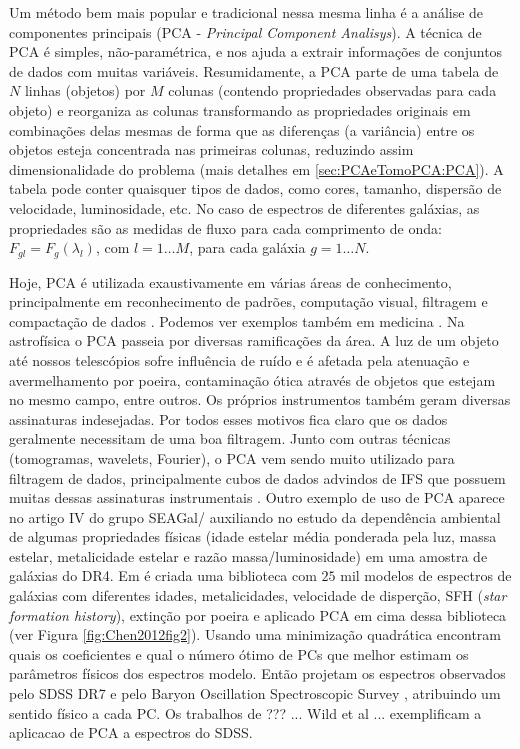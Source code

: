 Um método bem mais popular e tradicional nessa mesma linha é a análise de componentes principais (PCA - {\em Principal
Component Analisys}). A técnica de PCA é simples, não-paramétrica, e nos ajuda a extrair informações de conjuntos de
dados com muitas variáveis. Resumidamente, a PCA parte de uma tabela de $N$ linhas (objetos) por $M$ colunas (contendo
propriedades observadas para cada objeto) e reorganiza as colunas transformando as propriedades originais em combinações
delas mesmas de forma que as diferenças (a variância) entre os objetos  esteja concentrada nas primeiras colunas,
reduzindo assim dimensionalidade do problema (mais detalhes em \ref{sec:PCAeTomoPCA:PCA}). A tabela pode conter
quaisquer tipos de dados, como cores, tamanho, dispersão de velocidade, luminosidade, etc. No caso de espectros de
diferentes galáxias, as propriedades são as medidas de fluxo para cada comprimento de onda: $F_{gl} = F_g(\lambda_l)$,
com $l = 1 \ldots M$, para cada galáxia $g = 1 \ldots N$.

Hoje, PCA é utilizada exaustivamente em várias áreas de conhecimento, principalmente em reconhecimento de padrões,
computação visual, filtragem e compactação de dados \citep{Kamruzzaman2010, Borcea2012}. Podemos ver exemplos também em
medicina \citep{Balakrishnan2013}. Na astrofísica o PCA passeia por diversas ramificações da área. A luz de um objeto
até nossos telescópios sofre influência de ruído e é afetada pela atenuação e avermelhamento por poeira, contaminação
ótica através de objetos que estejam no mesmo campo, entre outros. Os próprios instrumentos também geram diversas
assinaturas indesejadas. Por todos esses motivos fica claro que os dados geralmente necessitam de uma boa filtragem.
Junto com outras técnicas (tomogramas, wavelets, Fourier), o PCA vem sendo muito utilizado para filtragem de dados,
principalmente cubos de dados advindos de IFS que possuem muitas dessas assinaturas instrumentais \citep{Riffel2011}.
Outro exemplo de uso de PCA aparece no artigo IV do grupo SEAGal/\starlight \citep{Mateus2007} auxiliando no estudo da
dependência ambiental de algumas propriedades físicas (idade estelar média ponderada pela luz, massa estelar,
metalicidade estelar e razão massa/luminosidade) em uma amostra de galáxias do \SDSS DR4. Em \citet{Chen2012} é criada
uma biblioteca com $25$ mil modelos de espectros de galáxias com diferentes idades, metalicidades, velocidade de
disperção, SFH ({\em star formation history}), extinção por poeira e aplicado PCA em cima dessa biblioteca (ver Figura
\ref{fig:Chen2012fig2}). Usando uma minimização quadrática encontram quais os coeficientes e qual o número ótimo de PCs
que melhor estimam os parâmetros físicos dos espectros modelo. Então projetam os espectros observados pelo SDSS DR7
\citep{Abazajian2009} e pelo Baryon Oscillation Spectroscopic Survey \citep[BOSS][]{Ahn2012}, atribuindo um sentido
físico a cada PC. Os trabalhos de \ojo ??? ... Wild et al  ... exemplificam a aplicacao de PCA a espectros do SDSS.

